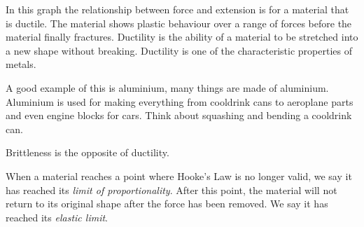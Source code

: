 In this graph the relationship between force and extension is for a material that is ductile. The material shows plastic behaviour over a range of forces before the material finally fractures. Ductility is the ability of a material to be stretched into a new shape without breaking. Ductility is one of the characteristic properties of metals.

A good example of this is aluminium, many things are made of aluminium. Aluminium is used for making everything from cooldrink cans to aeroplane parts and even engine blocks for cars. Think about squashing and bending a cooldrink can.

Brittleness is the opposite of ductility.


 
When a material reaches a point where Hooke's Law is no longer valid, we say it has reached its \emph{limit of proportionality}. After this point, the material will not return to its original shape after the force has been removed. We say it has reached its \emph{elastic limit}.



\newpage


